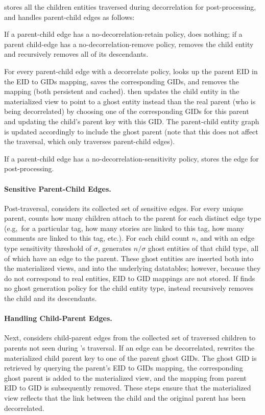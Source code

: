 \sys{} stores all the children entities traversed during decorrelation for post-processing, and
handles parent-child edges as follows:

If a parent-child edge has a no-decorrelation-retain policy, \sys{} does nothing; if a parent child-edge has a
no-decorrelation-remove policy, \sys{} removes the child entity and recursively removes all of its
descendants. 

For every parent-child edge with a decorrelate policy, \sys{} looks up the parent EID in the
EID to GIDs mapping, saves the corresponding GIDs, and removes the mapping (both persistent and
cached).
\sys{} then updates the child entity in the materialized view to point to a ghost entity instead
than the real parent (who is being decorrelated) by choosing one of the corresponding GIDs for this
parent and updating the child's parent key with this GID.  The parent-child entity graph is updated
accordingly to include the ghost parent (note that this does not affect the traversal, which only
traverses parent-child edges).

If a parent-child edge has a no-decorrelation-sensitivity policy, \sys{} stores the edge for
post-processing.

\paragraph{Sensitive Parent-Child Edges.}
Post-traversal, \sys{} considers its collected set of sensitive edges. For every unique parent,
\sys{} counts how many children attach to the parent for each distinct edge type (e.g,\ for a
particular tag, how many stories are linked to this tag, how many comments are linked to this tag,
etc.). For each child count $n$, and with an edge type sensitivity threshold of $\sigma$, 
\sys{} generates $n / \sigma$ ghost entities of that child type, all of which have an edge to the parent.
These ghost entities are inserted both into the materialized views, and into the underlying
datatables; however, because they do not correspond to real entities, EID to GID mappings are not
stored. 
If \sys{} finds no ghost generation policy for the child entity type, \sys{} instead recursively
removes the child and its descendants.

\paragraph{Handling Child-Parent Edges.}
Next, \sys{} considers child-parent edges from the collected set of traversed children to parents
not seen during \sys{}'s traversal. If an 
edge can be decorrelated, \sys{} rewrites the materialized child parent key to one of the parent
ghost GIDs. The ghost GID is retrieved by querying the parent's EID to GIDs mapping, the
corresponding ghost parent is added to the materialized view,
and the mapping from parent EID to GID is subsequently removed. These steps ensure that the
materialized view reflects that the link between the child and the original parent has been
decorrelated.

